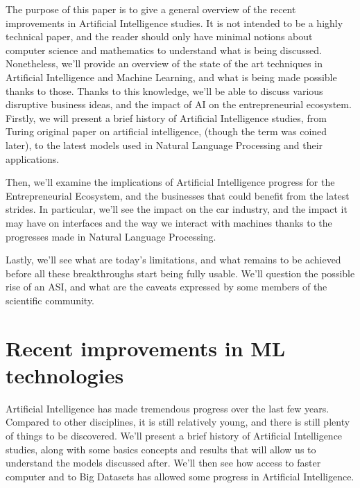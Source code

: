 \documentclass[12pt]{article}
\begin{document}
The purpose of this paper is to give a general overview of the recent
improvements in Artificial Intelligence studies. It is not intended to be a
highly technical paper, and the reader should only have minimal notions about
computer science and mathematics to understand what is being discussed.
Nonetheless, we'll provide an overview of the state of the art techniques in
Artificial Intelligence and Machine Learning, and what is being made possible
thanks to those. Thanks to this knowledge, we'll be able to discuss various
disruptive business ideas, and the impact of AI on the entrepreneurial
ecosystem. \\

Firstly, we will present a brief history of Artificial Intelligence studies, from
Turing original paper on artificial intelligence, (though the term was coined
later), to the latest models used in Natural Language Processing and their
applications.

\noindent Then, we'll examine the implications of Artificial Intelligence
progress for the Entrepreneurial Ecosystem, and the businesses that could benefit
from the latest strides. In particular, we'll see the impact on the car
industry, and the impact it may have on interfaces and the way we interact with
machines thanks to the progresses made in Natural Language Processing.

\noindent Lastly, we'll see what are today's limitations, and what remains to be
achieved before all these breakthroughs start being fully usable. We'll question
the possible rise of an \gls{ASI}, and what are the caveats
expressed by some members of the scientific community.

\pagebreak


\section{Recent improvements in ML technologies}

Artificial Intelligence has made tremendous progress over the last few years.
Compared to other disciplines, it is still relatively young, and there is still
plenty of things to be discovered. We'll present a brief history of Artificial
Intelligence studies, along with some basics concepts and results that will
allow us to understand the models discussed after. We'll then see how access to
faster computer and to Big Datasets has allowed some progress in Artificial
Intelligence.
\end{document}

